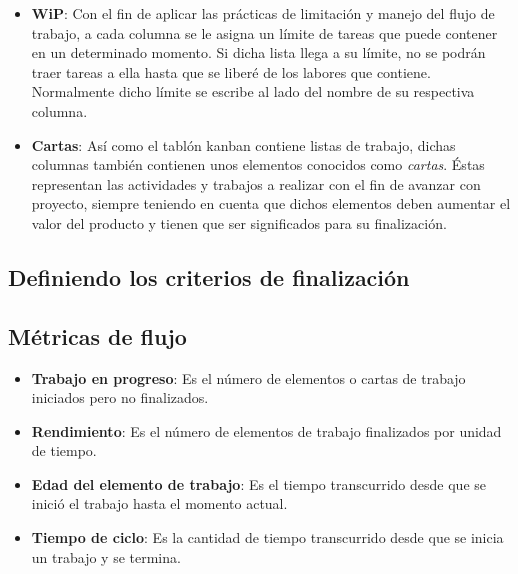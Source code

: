 \begin{itemize}
    \item \textbf{WiP}: Con el fin de aplicar las prácticas de limitación y
    manejo del flujo de trabajo, a cada columna se le asigna un límite de tareas
    que puede contener en un determinado momento. Si dicha lista llega a su
    límite, no se podrán traer tareas a ella hasta que se liberé de los labores
    que contiene. Normalmente dicho límite se escribe al lado del nombre de su
    respectiva columna.

    \item \textbf{Cartas}:
    Así como el tablón kanban contiene listas de trabajo, dichas columnas
    también contienen unos elementos conocidos como \emph{cartas}. Éstas
    representan las actividades y trabajos a realizar con el fin de avanzar con
    proyecto, siempre teniendo en cuenta que dichos elementos deben aumentar el
    valor del producto y tienen que ser significados para su finalización.
\end{itemize}

\subsection{Definiendo los criterios de finalización}

\subsection{Métricas de flujo}

\begin{itemize}
    \item \textbf{Trabajo en progreso}: Es el número de elementos o cartas de
    trabajo iniciados pero no finalizados.
    \item \textbf{Rendimiento}: Es el número de elementos de trabajo finalizados
    por unidad de tiempo.
    \item \textbf{Edad del elemento de trabajo}: Es el tiempo transcurrido desde
    que se inició el trabajo hasta el momento actual.
    \item \textbf{Tiempo de ciclo}: Es la cantidad de tiempo transcurrido desde
    que se inicia un trabajo y se termina.
\end{itemize}

